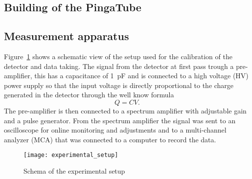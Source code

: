 \subsection{Building of the PingaTube}
\label{sec:building-pingatube}

\subsection{Measurement apparatus}
\label{sec:meas-appar}
Figure~\ref{fig:exp_setup} shows a schematic view of the setup used for the
calibration of the detector and data taking. The signal from the detector at
first pass trough a pre-amplifier, this has a capacitance of 1~pF and is
connected to a high voltage (HV) power supply so that the input voltage is
directly proportional to the charge generated in the detector through the well
know formula
\begin{equation}
  \label{eq:capacitance}
  Q = CV.
\end{equation}
The pre-amplifier is then connected to a spectrum amplifier with adjustable gain
and a pulse generator. From the spectrum amplifier the signal was sent to an
oscilloscope for online monitoring and adjustments and to a multi-channel
analyzer (MCA) that was connected to a computer to record the data.
\begin{figure}[!h]
  \centering
  \texttt{[image: experimental\_setup]}
  \caption{Schema of the experimental setup}
  \label{fig:exp_setup}
\end{figure}
